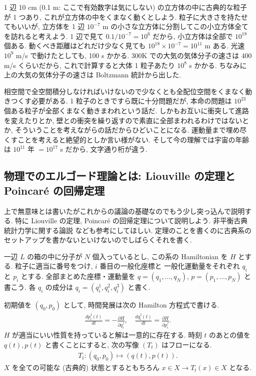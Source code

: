 \documentclass[openany, a4paper, oneside]{jsbook}
\begin{document}
1 辺 10 cm (0.1 m: ここで有効数字は気にしない) の立方体の中に古典的な粒子が 1 つあり,
これが立方体の中をくまなく動くとしよう.
粒子に大きさを持たせてもいいが, 立方体を 1 辺 $10^{-7}$ m
の小さな立方体に分割してこの小立方体全てを訪れると考えよう.
1 辺で見て $0.1 / 10^{-7} = 10^6$ だから,
小立方体は全部で $10^{18}$ 個ある.
動くべき距離はどれだけ少なく見ても $10^{18} \times 10^{-7} = 10^{11}$ m ある.
光速 $10^{9}$ m/s で動けたとしても, 100 s かかる.
300K での大気の気体分子の速さは 400 m/s くらいだから,
これで計算すると大体 1 粒子あたり $10^{8}$ s かかる.
ちなみに上の大気の気体分子の速さは Boltzmann 統計から出した.

相空間で全空間積分しなければいけないので少なくとも全配位空間をくまなく動きつくす必要がある.
1 粒子のときですら既に十分問題だが,
本命の問題は $10^{23}$ 個ある粒子が全部くまなく動きまわれという話だ.
しかもお互いに衝突して進路を変えたりとか,
壁との衝突を繰り返すので素直に全部まわれるわけではないとか,
そういうことを考えながらの話だからひどいことになる.
運動量まで埋め尽くすことを考えると絶望的としか言い様がない.
そして今の理解では宇宙の年齢は $10^{11}$ 年 $= 10^{17}$ s だから, 文字通り桁が違う.
\subsection{物理でのエルゴード理論とは: Liouville の定理と Poincar\'e の回帰定理}

上で無意味とは書いたがこれからの議論の基礎なのでもう少し突っ込んで説明する.
特に Liouville の定理, Poincar\'e の回帰定理について説明しよう.
非平衡古典統計力学に関する論説 \cite{ShuichiTasaki1} なども参考にしてほしい.
定理のことを書くのに古典系のセットアップを書かないといけないのでしばらくそれを書く.

一辺 $L$ の箱の中に分子が $N$ 個入っているとし,
この系の Hamiltonian を $H$ とする.
粒子に適当に番号をつけ, $i$ 番目の一般化座標と
一般化運動量をそれぞれ $q_i$ と $p_i$ とする.
全部まとめた座標・運動量を $q = (q_1, \dots, q_N)$,
$p = (p_1, \dots, p_N)$ と書こう.
各 $q_i$ の成分は $q_i = (q_i^1, q_i^2, q_i^3)$ と書く.

初期値を $(q_0, p_0)$ として,
時間発展は次の Hamilton 方程式で書ける.
\begin{align}
 \frac{d p_{i}^j (t)}{dt}
 =
 -\frac{\partial H}{\partial q_i^j}, \quad
 \frac{d q_{i}^j (t)}{dt}
 =
 \frac{\partial H}{\partial p_i^j}.
\end{align}
$H$ が適当にいい性質を持っていると解は一意的に存在する.
時刻 $t$ のあとの値を $q(t), p(t)$ と書くことにすると,
次の写像 $(T_t)$ はフローになる.
\begin{align}
 T_t \colon
 (q_0, p_0) \mapsto (q(t), p(t)).
\end{align}
$X$ を全ての可能な (古典的) 状態とするともちろん $x \in X \to T_t (x) \in X$ となる.
\end{document}
